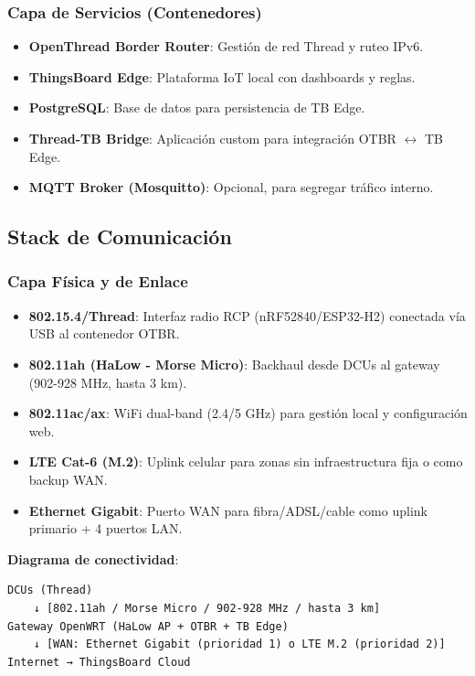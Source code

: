 \subsubsection{Capa de Servicios (Contenedores)}

\begin{itemize}
    \item \textbf{OpenThread Border Router}: Gestión de red Thread y ruteo IPv6.
    \item \textbf{ThingsBoard Edge}: Plataforma IoT local con dashboards y reglas.
    \item \textbf{PostgreSQL}: Base de datos para persistencia de TB Edge.
    \item \textbf{Thread-TB Bridge}: Aplicación custom para integración OTBR $\leftrightarrow$ TB Edge.
    \item \textbf{MQTT Broker (Mosquitto)}: Opcional, para segregar tráfico interno.
\end{itemize}

\subsection{Stack de Comunicación}

\subsubsection{Capa Física y de Enlace}

\begin{itemize}
    \item \textbf{802.15.4/Thread}: Interfaz radio RCP (nRF52840/ESP32-H2) conectada vía USB al contenedor OTBR.
    \item \textbf{802.11ah (HaLow - Morse Micro)}: Backhaul desde DCUs al gateway (902-928 MHz, hasta 3 km).
    \item \textbf{802.11ac/ax}: WiFi dual-band (2.4/5 GHz) para gestión local y configuración web.
    \item \textbf{LTE Cat-6 (M.2)}: Uplink celular para zonas sin infraestructura fija o como backup WAN.
    \item \textbf{Ethernet Gigabit}: Puerto WAN para fibra/ADSL/cable como uplink primario + 4 puertos LAN.
\end{itemize}

\textbf{Diagrama de conectividad}:
\begin{verbatim}
DCUs (Thread) 
    ↓ [802.11ah / Morse Micro / 902-928 MHz / hasta 3 km]
Gateway OpenWRT (HaLow AP + OTBR + TB Edge)
    ↓ [WAN: Ethernet Gigabit (prioridad 1) o LTE M.2 (prioridad 2)]
Internet → ThingsBoard Cloud
\end{verbatim}

